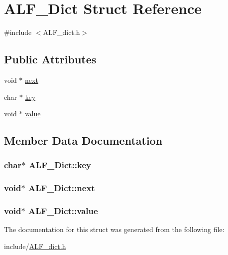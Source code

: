 \hypertarget{structALF__Dict}{}\section{A\+L\+F\+\_\+\+Dict Struct Reference}
\label{structALF__Dict}


{\ttfamily \#include $<$A\+L\+F\+\_\+dict.\+h$>$}

\subsection*{Public Attributes}
\begin{DoxyCompactItemize}
\item 
void $\ast$ \hyperlink{structALF__Dict_abf4da60193bf9ced8fb3c8b013e23f18}{next}
\item 
char $\ast$ \hyperlink{structALF__Dict_a8850433b9edd2131631fdea81f005ebf}{key}
\item 
void $\ast$ \hyperlink{structALF__Dict_a00b3284fe9ac4af7137cbdac1a61f67a}{value}
\end{DoxyCompactItemize}


\subsection{Member Data Documentation}
\subsubsection[{\texorpdfstring{key}{key}}]{\setlength{\rightskip}{0pt plus 5cm}char$\ast$ A\+L\+F\+\_\+\+Dict\+::key}\hypertarget{structALF__Dict_a8850433b9edd2131631fdea81f005ebf}{}\label{structALF__Dict_a8850433b9edd2131631fdea81f005ebf}
\subsubsection[{\texorpdfstring{next}{next}}]{\setlength{\rightskip}{0pt plus 5cm}void$\ast$ A\+L\+F\+\_\+\+Dict\+::next}\hypertarget{structALF__Dict_abf4da60193bf9ced8fb3c8b013e23f18}{}\label{structALF__Dict_abf4da60193bf9ced8fb3c8b013e23f18}
\subsubsection[{\texorpdfstring{value}{value}}]{\setlength{\rightskip}{0pt plus 5cm}void$\ast$ A\+L\+F\+\_\+\+Dict\+::value}\hypertarget{structALF__Dict_a00b3284fe9ac4af7137cbdac1a61f67a}{}\label{structALF__Dict_a00b3284fe9ac4af7137cbdac1a61f67a}


The documentation for this struct was generated from the following file\+:\begin{DoxyCompactItemize}
\item 
include/\hyperlink{ALF__dict_8h}{A\+L\+F\+\_\+dict.\+h}\end{DoxyCompactItemize}

